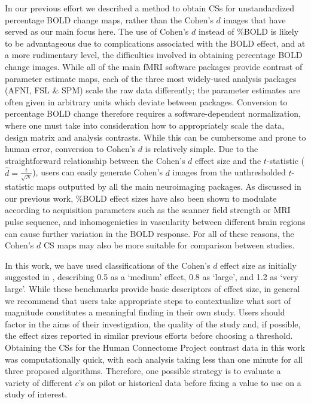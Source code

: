 In our previous effort we described a method to obtain CSs for unstandardized percentage BOLD change maps, rather than the Cohen's $d$ images that have served as our main focus here. The use of Cohen's $d$ instead of \%BOLD is likely to be advantageous due to complications associated with the BOLD effect, and at a more rudimentary level, the difficulties involved in obtaining percentage BOLD change images. While all of the main fMRI software packages provide contrast of parameter estimate maps, each of the three most widely-used analysis packages (AFNI, FSL \& SPM) scale the raw data differently; the parameter estimates are often given in arbitrary units which deviate between packages. Conversion to percentage BOLD change therefore requires a software-dependent normalization, where one must take into consideration how to appropriately scale the data, design matrix and analysis contrasts. While this can be cumbersome and prone to human error, conversion to Cohen's $d$ is relatively simple. Due to the straightforward relationship between the Cohen's $d$ effect size and the $t$-statistic \Big($\hat{d} = \frac{t}{\sqrt{N}}$\Big), users can easily generate Cohen's $d$ images from the unthresholded $t$-statistic maps outputted by all the main neuroimaging packages. As discussed in our previous work, \%BOLD effect sizes have also been shown to modulate according to acquisition parameters such as the scanner field strength or MRI pulse sequence, and inhomogenieties in vascularity between different brain regions can cause further variation in the BOLD response. For all of these reasons, the Cohen's $d$ CS maps may also be more suitable for comparison between studies. 

In this work, we have used classifications of the Cohen's $d$ effect size as initially suggested in \textit{\citet*{Cohen2013-it}}, describing 0.5 as a `medium' effect, 0.8 as `large', and 1.2 as `very large'. While these benchmarks provide basic descriptors of effect size, in general we recommend that users take appropriate steps to contextualize what sort of magnitude constitutes a meaningful finding in their own study. Users should factor in the aims of their investigation, the quality of the study and, if possible, the effect sizes reported in similar previous efforts before choosing a threshold. Obtaining the CSs for the Human Connectome Project contrast data in this work was computationally quick, with each analysis taking less than one minute for all three proposed algorithms. Therefore, one possible strategy is to evaluate a variety of different $c$'s on pilot or historical data before fixing a value to use on a study of interest.

